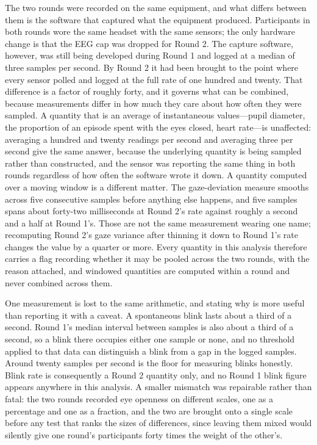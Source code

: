 The two rounds were recorded on the same equipment, and what differs between them is the
software that captured what the equipment produced. Participants in both rounds wore the same
headset with the same sensors; the only hardware change is that the EEG cap was dropped for
Round 2. The capture software, however, was still being developed during Round 1 and logged at
a median of three samples per second. By Round 2 it had been brought to the point where every
sensor polled and logged at the full rate of one hundred and twenty. That difference is a
factor of roughly forty, and it governs what can be combined, because measurements differ in
how much they care about how often they were sampled. A
quantity that is an average of instantaneous values---pupil diameter, the proportion of an
episode spent with the eyes closed, heart rate---is unaffected: averaging a hundred and twenty
readings per second and averaging three per second give the same answer, because the underlying
quantity is being sampled rather than constructed, and the sensor was reporting the same thing
in both rounds regardless of how often the software wrote it down. A quantity computed over a
moving window is a different matter. The gaze-deviation measure smooths across five consecutive samples before
anything else happens, and five samples spans about forty-two milliseconds at Round 2's rate
against roughly a second and a half at Round 1's. Those are not the same measurement wearing one
name; recomputing Round 2's gaze variance after thinning it down to Round 1's rate changes the
value by a quarter or more. Every quantity in this analysis therefore carries a flag recording
whether it may be pooled across the two rounds, with the reason attached, and windowed
quantities are computed within a round and never combined across them.

One measurement is lost to the same arithmetic, and stating why is more useful than reporting
it with a caveat. A spontaneous blink lasts about a third of a second. Round 1's median interval
between samples is also about a third of a second, so a blink there occupies either one sample
or none, and no threshold applied to that data can distinguish a blink from a gap in the logged samples.
Around twenty samples per second is the floor for measuring blinks honestly. Blink rate is
consequently a Round 2 quantity only, and no Round 1 blink figure appears anywhere in this
analysis. A smaller mismatch was repairable rather than fatal: the two rounds recorded eye
openness on different scales, one as a percentage and one as a fraction, and the two are brought
onto a single scale before any test that ranks the sizes of differences, since leaving them
mixed would silently give one round's participants forty times the weight of the other's.

